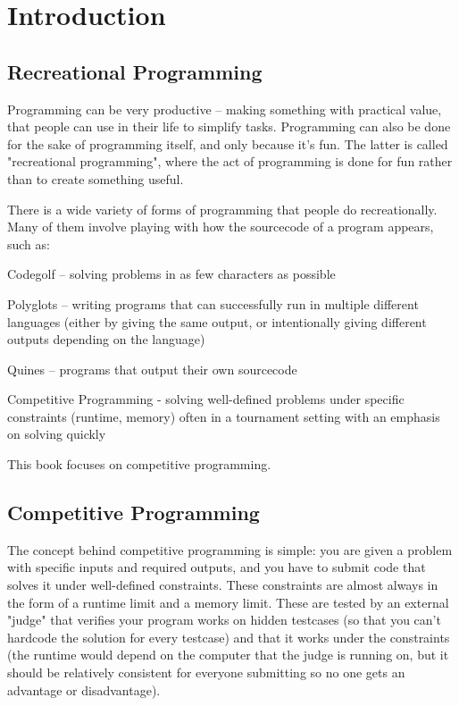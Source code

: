 \section{Introduction}
\subsection{Recreational Programming}

Programming can be very productive -- making something with practical value, that people can use in their life to simplify tasks. Programming can also be done for the sake of programming itself, and only because it's fun. The latter is called "recreational programming", where the act of programming is done for fun rather than to create something useful.

There is a wide variety of forms of programming that people do recreationally. Many of them involve playing with how the sourcecode of a program appears, such as:
\begin{enum}
\item Codegolf -- solving problems in as few characters as possible
\item Polyglots -- writing programs that can successfully run in multiple different languages (either by giving the same output, or intentionally giving different outputs depending on the language)
\item Quines -- programs that output their own sourcecode
\item Competitive Programming - solving well-defined problems under specific constraints (runtime, memory) often in a tournament setting with an emphasis on solving quickly
\end{enum}

This book focuses on competitive programming.

\subsection{Competitive Programming}

The concept behind competitive programming is simple: you are given a problem with specific inputs and required outputs, and you have to submit code that solves it under well-defined constraints. These constraints are almost always in the form of a runtime limit and a memory limit. These are tested by an external "judge" that verifies your program works on hidden testcases (so that you can't hardcode the solution for every testcase) and that it works under the constraints (the runtime would depend on the computer that the judge is running on, but it should be relatively consistent for everyone submitting so no one gets an advantage or disadvantage).

